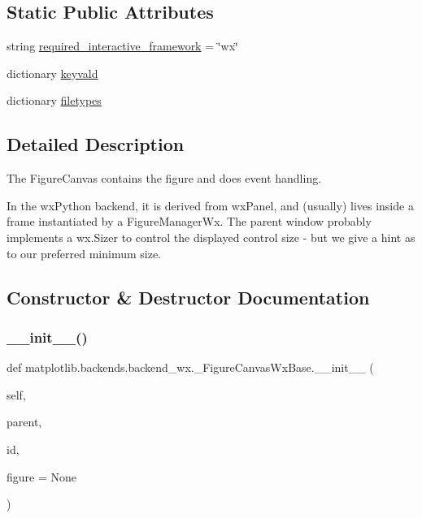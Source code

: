 \subsection*{Static Public Attributes}
\begin{DoxyCompactItemize}
\item 
string \hyperlink{classmatplotlib_1_1backends_1_1backend__wx_1_1__FigureCanvasWxBase_adbc8a80512bb6c343f50f513cb0e2c1d}{required\+\_\+interactive\+\_\+framework} = \char`\"{}wx\char`\"{}
\item 
dictionary \hyperlink{classmatplotlib_1_1backends_1_1backend__wx_1_1__FigureCanvasWxBase_abdc2234f1d7c8a97cd23c65db965cc47}{keyvald}
\item 
dictionary \hyperlink{classmatplotlib_1_1backends_1_1backend__wx_1_1__FigureCanvasWxBase_ae766ab9d54670f46b0a055004f873c41}{filetypes}
\end{DoxyCompactItemize}


\subsection{Detailed Description}
\begin{DoxyVerb}The FigureCanvas contains the figure and does event handling.

In the wxPython backend, it is derived from wxPanel, and (usually) lives
inside a frame instantiated by a FigureManagerWx. The parent window
probably implements a wx.Sizer to control the displayed control size - but
we give a hint as to our preferred minimum size.
\end{DoxyVerb}
 

\subsection{Constructor \& Destructor Documentation}
\mbox{\label{classmatplotlib_1_1backends_1_1backend__wx_1_1__FigureCanvasWxBase_abba326c6c83b25b4a23bdca1761eb3de}} 
\subsubsection{\texorpdfstring{\+\_\+\+\_\+init\+\_\+\+\_\+()}{\_\_init\_\_()}}
{\footnotesize\ttfamily def matplotlib.\+backends.\+backend\+\_\+wx.\+\_\+\+Figure\+Canvas\+Wx\+Base.\+\_\+\+\_\+init\+\_\+\+\_\+ (\begin{DoxyParamCaption}\item[{}]{self,  }\item[{}]{parent,  }\item[{}]{id,  }\item[{}]{figure = {\ttfamily None} }\end{DoxyParamCaption})}

